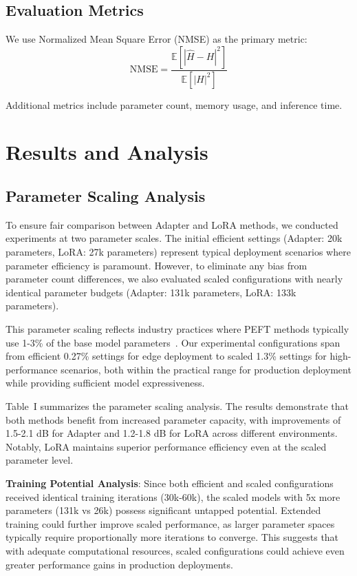 \documentclass[conference]{IEEEtran}
\begin{document}
\subsection{Evaluation Metrics}

We use Normalized Mean Square Error (NMSE) as the primary metric:
\begin{equation}
\text{NMSE} = \frac{\mathbb{E}[|\hat{H} - H|^2]}{\mathbb{E}[|H|^2]}
\end{equation}

Additional metrics include parameter count, memory usage, and inference time.

\section{Results and Analysis}

\subsection{Parameter Scaling Analysis}

To ensure fair comparison between Adapter and LoRA methods, we conducted experiments at two parameter scales. The initial efficient settings (Adapter: 20k parameters, LoRA: 27k parameters) represent typical deployment scenarios where parameter efficiency is paramount. However, to eliminate any bias from parameter count differences, we also evaluated scaled configurations with nearly identical parameter budgets (Adapter: 131k parameters, LoRA: 133k parameters).

This parameter scaling reflects industry practices where PEFT methods typically use 1-3\% of the base model parameters~\cite{hu2021lora, houlsby2019parameter}. Our experimental configurations span from efficient 0.27\% settings for edge deployment to scaled 1.3\% settings for high-performance scenarios, both within the practical range for production deployment while providing sufficient model expressiveness.

Table~I summarizes the parameter scaling analysis. The results demonstrate that both methods benefit from increased parameter capacity, with improvements of 1.5-2.1 dB for Adapter and 1.2-1.8 dB for LoRA across different environments. Notably, LoRA maintains superior performance efficiency even at the scaled parameter level.

\textbf{Training Potential Analysis}: Since both efficient and scaled configurations received identical training iterations (30k-60k), the scaled models with 5x more parameters (131k vs 26k) possess significant untapped potential. Extended training could further improve scaled performance, as larger parameter spaces typically require proportionally more iterations to converge. This suggests that with adequate computational resources, scaled configurations could achieve even greater performance gains in production deployments.
\end{document}

